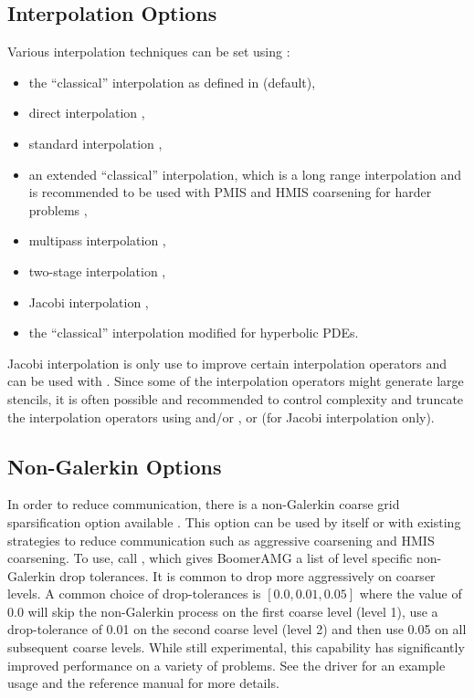 \subsection{Interpolation Options}
Various interpolation techniques can be set using :
\begin{itemize}
\item the ``classical'' interpolation as defined in \cite{Ruge_Stueben_1987} (default),
\item direct interpolation \cite{Stueben_1999},
\item standard interpolation \cite{Stueben_1999},
\item an extended ``classical'' interpolation, which is a long range interpolation and is recommended to be used with PMIS and HMIS coarsening for harder problems \cite{DeSterck_Falgout_Nolting_Yang_2008},
\item multipass interpolation \cite{Stueben_1999},
\item two-stage interpolation \cite{UMYang_2010},
\item Jacobi interpolation \cite{Stueben_1999},
\item the ``classical'' interpolation modified for hyperbolic PDEs.
\end{itemize}
Jacobi interpolation is only use to improve certain interpolation operators and can be 
used with .
Since some of the interpolation operators might generate large stencils, it is often possible 
and recommended to control complexity and truncate the interpolation operators
using  and/or ,
or  (for Jacobi interpolation only).

\subsection{Non-Galerkin Options}
In order to reduce communication, there is a non-Galerkin coarse grid
sparsification option available \cite{FaSc2014}.  This option can be used by
itself or with existing strategies to reduce communication such as aggressive
coarsening and HMIS coarsening.  To use, call
, which gives BoomerAMG a list of level
specific non-Galerkin drop tolerances.  It is common to drop more aggressively
on coarser levels.  A common choice of drop-tolerances is $[0.0,
0.01, 0.05]$ where the value of 0.0 will skip the non-Galerkin process on the
first coarse level (level 1), use a drop-tolerance of 0.01 on the second coarse
level (level 2) and then use 0.05 on all subsequent coarse levels.  While still
experimental, this capability has significantly improved performance on a
variety of problems.  See the  driver for an example usage and the
reference manual for more details.


